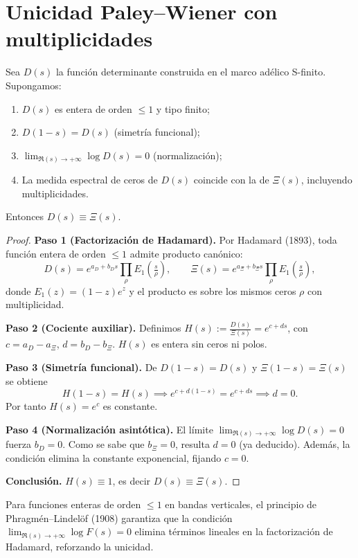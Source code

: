 \section{Unicidad Paley--Wiener con multiplicidades}

\begin{theorem}
\label{thm:paley-wiener-uniqueness}
Sea $D(s)$ la función determinante construida en el marco adélico S-finito. Supongamos:
\begin{enumerate}
\item $D(s)$ es entera de orden $\leq 1$ y tipo finito;
\item $D(1-s) = D(s)$ (simetría funcional);
\item $\lim_{\Re(s)\to+\infty} \log D(s) = 0$ (normalización);
\item La medida espectral de ceros de $D(s)$ coincide con la de $\Xi(s)$, 
incluyendo multiplicidades.
\end{enumerate}
Entonces $D(s) \equiv \Xi(s)$.
\end{theorem}

\begin{proof}
\textbf{Paso 1 (Factorización de Hadamard).}  
Por Hadamard (1893), toda función entera de orden $\leq 1$ admite producto canónico:
\[
D(s) = e^{a_D + b_D s} \prod_{\rho}\!E_1\!\left(\tfrac{s}{\rho}\right), 
\qquad 
\Xi(s) = e^{a_\Xi + b_\Xi s} \prod_{\rho}\!E_1\!\left(\tfrac{s}{\rho}\right),
\]
donde $E_1(z) = (1-z)e^z$ y el producto es sobre los mismos ceros $\rho$ con multiplicidad.

\textbf{Paso 2 (Cociente auxiliar).}  
Definimos $H(s) := \tfrac{D(s)}{\Xi(s)} = e^{c + ds}$, con $c=a_D-a_\Xi$, $d=b_D-b_\Xi$.  
$H(s)$ es entera sin ceros ni polos.

\textbf{Paso 3 (Simetría funcional).}  
De $D(1-s)=D(s)$ y $\Xi(1-s)=\Xi(s)$ se obtiene
\[
H(1-s) = H(s) \implies e^{c+d(1-s)} = e^{c+ds} \implies d=0.
\]
Por tanto $H(s)=e^c$ es constante.

\textbf{Paso 4 (Normalización asintótica).}  
El límite $\lim_{\Re(s)\to+\infty} \log D(s)=0$ fuerza $b_D=0$. Como se sabe que $b_\Xi=0$, resulta $d=0$ (ya deducido). Además, la condición elimina la constante exponencial, fijando $c=0$.

\textbf{Conclusión.}  
$H(s)\equiv 1$, es decir $D(s)\equiv \Xi(s)$.
\end{proof}

\begin{lemma}\label{lem:phragmen}
Para funciones enteras de orden $\leq 1$ en bandas verticales, el principio de Phragmén–Lindelöf (1908) garantiza que la condición $\lim_{\Re(s)\to+\infty}\log F(s)=0$ elimina términos lineales en la factorización de Hadamard, reforzando la unicidad.
\end{lemma}

